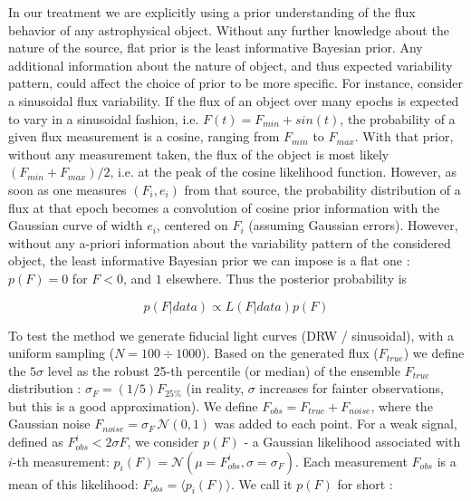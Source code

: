 \documentclass[fleqn,usenatbib]{mnras}  %
\begin{document}
%
%

In our treatment we are explicitly using a prior understanding of the flux behavior of any astrophysical object.  Without any further knowledge about the nature of the source, flat prior is the least informative Bayesian prior. Any additional information about the nature of object, and thus expected variability pattern,  could affect the choice of prior to be more specific. For instance,  consider a sinusoidal flux variability. If the flux of an object over many epochs is expected to vary in a sinusoidal fashion, i.e. $F(t) = F_{min}+ sin(t)$, the probability of a given  flux measurement is a cosine, ranging from $F_{min}$ to $F_{max}$. With that prior, without any measurement taken, the flux of the object is most likely  $(F_{min} + F_{max}) /  2$, i.e. at the peak of the cosine likelihood function. However, as soon as one measures $(F_{i},e_{i})$ from that source, the probability distribution of a flux at that epoch becomes a convolution of cosine prior information with the Gaussian curve of width $e_{i}$, centered on $F_{i}$ (assuming Gaussian errors). However, without any a-priori information about the variability pattern of the considered object, the least informative Bayesian prior we can impose is a flat one : $p(F)=0 $ for $F<0$, and $1$ elsewhere. Thus the posterior probability is 

\begin{equation}
p(F|data) \propto L(F|data) p(F)
\end{equation}


%
%

To test the method we generate fiducial light curves (DRW / sinusoidal), with a uniform sampling ($N=100\div1000$). Based on the generated flux ($F_{true}$) we define the $5\sigma$ level as the robust 25-th percentile (or median) of the ensemble $F_{true}$ distribution :  $\sigma_{F} = (1/5)  F_{25 \%}$ (in reality, $\sigma$ increases for fainter observations, but this is a good approximation). 
\newline
We define $F_{obs} = F_{true} + F_{noise}$, where the Gaussian noise $F_{noise} = \sigma_{F}  \, \mathcal{N}(0,1)$ was added to each point. 
For a weak signal, defined as $F_{obs}^{i} < 2 \sigma{F}$, we consider $p(F)$  - a  Gaussian  likelihood associated with $i$-th measurement: $p_{i}(F) = \mathcal{N}(\mu=F_{obs}^{i}, \sigma=\sigma_{F})$. Each measurement $F_{obs}$ is a mean of this likelihood: $F_{obs} = \langle p_{i}(F) \rangle$. We call it $p(F)$  for short : 
\end{document}
